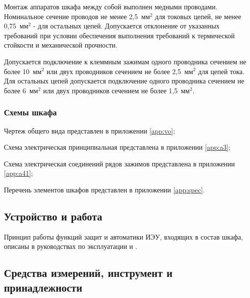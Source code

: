 \begin{enumsubsub}
\item Монтаж аппаратов шкафа между собой выполнен медными проводами. Номинальное сечение проводов не менее 2,5~мм$^2$ для токовых цепей, не менее 0,75~мм$^2$ - для остальных цепей. Допускается отклонение от указанных требований при условии обеспечения выполнения требований к термической стойкости и механической прочности.
\item Допускается подключение к клеммным зажимам одного проводника сечением не более 10~мм$^2$ или двух проводников сечением не более 2,5~мм$^2$ для цепей тока. Для остальных цепей допускается подключение одного проводника сечением не более 6~мм$^2$ или двух проводников сечением не более 1,5~мм$^2$.
\end{enumsubsub}

\subsubsection{Схемы шкафа}
\begin{enumsubsub}
\item Чертеж общего вида представлен в приложении \ref{app:vo};
\item Схема электрическая принципиальная представлена в приложении \ref{app:a3};
\item Схема электрическая соединений рядов зажимов представлена в приложении \ref{app:a41};
\item Перечень элементов шкафов представлен в приложении \ref{app:spec}.
\end{enumsubsub}

{\color{unidarkgreen}\subsection{Устройство и работа} \label{sec1:4}}

Принцип работы функций защит и автоматики ИЭУ, входящих в состав шкафа, описаны в руководствах по эксплуатации \ManualUnitDefiniteOne и \ManualUnitDefiniteTwo.

{\color{unidarkgreen}\subsection{Средства измерений, инструмент и принадлежности}}

